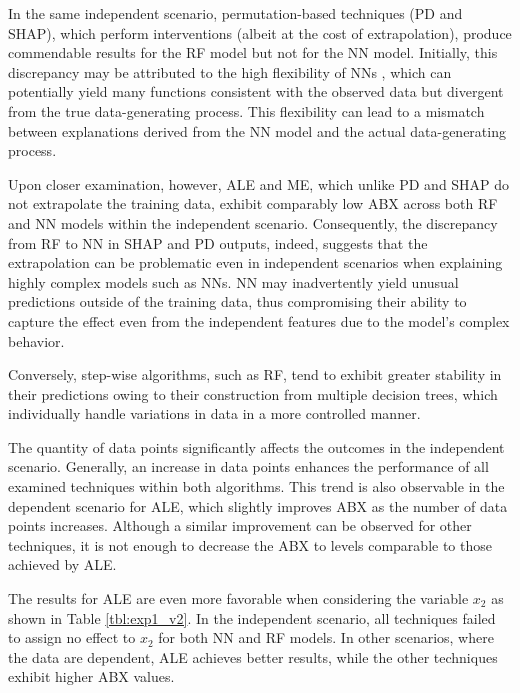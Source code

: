 In the same independent scenario, permutation-based techniques (PD and SHAP), which perform interventions (albeit at the cost of extrapolation), produce commendable results for the RF model but not for the NN model. Initially, this discrepancy may be attributed to the high flexibility of NNs \cite{Grinsztajn2022WhyData}, which can potentially yield many functions consistent with the observed data but divergent from the true data-generating process. This flexibility can lead to a mismatch between explanations derived from the NN model and the actual data-generating process. 

Upon closer examination, however, ALE and ME, which unlike PD and SHAP do not extrapolate the training data, exhibit comparably low ABX across both RF and NN models within the independent scenario. Consequently, the discrepancy from RF to NN in SHAP and PD outputs, indeed, suggests that the extrapolation can be problematic even in independent scenarios when explaining highly complex models such as NNs. NN may inadvertently yield unusual predictions outside of the training data, thus compromising their ability to capture the effect even from the independent features due to the model's complex behavior.

Conversely, step-wise algorithms, such as RF, tend to exhibit greater stability in their predictions owing to their construction from multiple decision trees, which individually handle variations in data in a more controlled manner.

The quantity of data points significantly affects the outcomes in the independent scenario. Generally, an increase in data points enhances the performance of all examined techniques within both algorithms. This trend is also observable in the dependent scenario for ALE, which slightly improves ABX as the number of data points increases. Although a similar improvement can be observed for other techniques, it is not enough to decrease the ABX to levels comparable to those achieved by ALE.

The results for ALE are even more favorable when considering the variable $x_2$ as shown in Table \ref{tbl:exp1_v2}. In the independent scenario, all techniques failed to assign no effect to $x_2$ for both NN and RF models. In other scenarios, where the data are dependent, ALE achieves better results, while the other techniques exhibit higher ABX values. 




